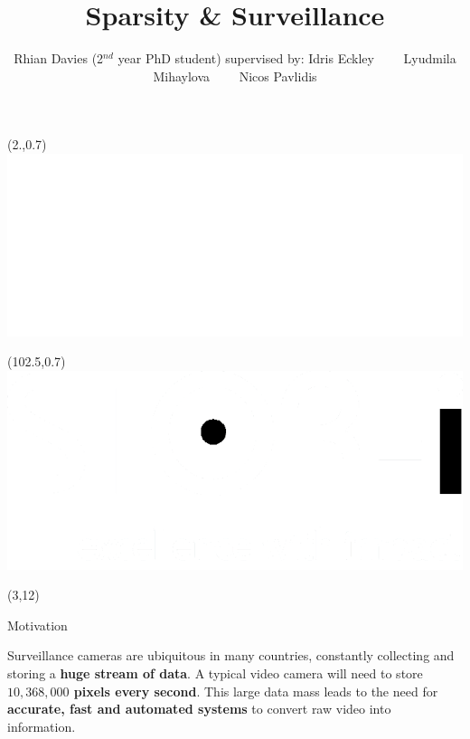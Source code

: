 \documentclass[final]{beamer}
\title{Sparsity \& Surveillance}
\author{Rhian Davies (2$^{nd}$ year PhD student) supervised by: Idris Eckley \ \ \ \  Lyudmila Mihaylova  \ \ \ \ Nicos Pavlidis}
\institute{STOR-i CDT  \ \ \ \ Lancaster University}
\date{}
\begin{document}
\begin{frame}{} 

\begin{textblock}{20}(2.,0.7)
\includegraphics[width=15cm]{logoleft.png}
\end{textblock}

\begin{textblock}{20}(102.5,0.7)
\includegraphics[width=15cm]{logoright.png}
\end{textblock}


\begin{textblock}{36}(3,12)
\begin{block}{Motivation}

Surveillance cameras are ubiquitous in many countries, constantly collecting and storing a  \textcolor{likePurple}{\textbf{huge stream of data}}. A typical video camera will need to store \textcolor{likePurple}{\textbf{$10,368,000$ pixels every second}}. This large data mass leads to the need for  \textcolor{likePurple}{\textbf{accurate, fast and automated systems}} to convert raw video into information.

\vspace{0.5cm}


\end{block}
\end{textblock}
\end{frame}
\end{document}
